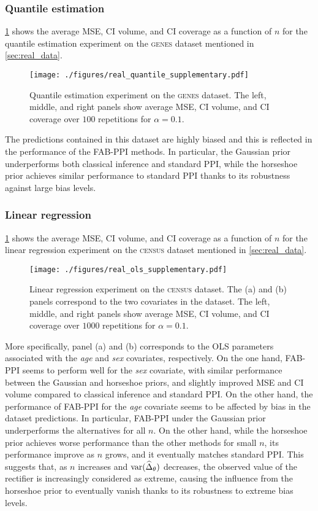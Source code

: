 \subsubsection{Quantile estimation}\label{app:quantile}
\cref{fig:real_quantile_supplementary} shows the average MSE, CI volume, and CI coverage as a function of $n$ for the quantile estimation experiment on the \textsc{genes} dataset mentioned in \cref{sec:real_data}.
\begin{figure}[ht!]
    \centering
    \texttt{[image: ./figures/real\_quantile\_supplementary.pdf]}
    \caption{Quantile estimation experiment on the \textsc{genes} dataset. The left, middle, and right panels show average MSE, CI volume, and CI coverage over $100$ repetitions for $\alpha = 0.1$.}
    \label{fig:real_quantile_supplementary}
\end{figure}
The predictions contained in this dataset are highly biased and this is reflected in the performance of the FAB-PPI methods. In particular, the Gaussian prior underperforms both classical inference and standard PPI, while the horseshoe prior achieves similar performance to standard PPI thanks to its robustness against large bias levels.

\subsubsection{Linear regression}\label{app:ols}
\cref{fig:real_quantile_supplementary} shows the average MSE, CI volume, and CI coverage as a function of $n$ for the linear regression experiment on the \textsc{census} dataset mentioned in \cref{sec:real_data}.
\begin{figure}[ht!]
    \centering
    \texttt{[image: ./figures/real\_ols\_supplementary.pdf]}
    \caption{Linear regression experiment on the \textsc{census} dataset. The (a) and (b) panels correspond to the two covariates in the dataset. The left, middle, and right panels show average MSE, CI volume, and CI coverage over $1000$ repetitions for $\alpha = 0.1$.}
    \label{fig:real_ols_supplementary}
\end{figure}
More specifically, panel (a) and (b) corresponds to the OLS parameters associated with the \textit{age} and \textit{sex} covariates, respectively. On the one hand, FAB-PPI seems to perform well for the \textit{sex} covariate, with similar performance between the Gaussian and horseshoe priors, and slightly improved MSE and CI volume compared to classical inference and standard PPI. On the other hand, the performance of FAB-PPI for the \textit{age} covariate seems to be affected by bias in the dataset predictions. In particular, FAB-PPI under the Gaussian prior underperforms the alternatives for all $n$. On the other hand, while the horseshoe prior achieves worse performance than the other methods for small $n$, its performance improve as $n$ grows, and it eventually matches standard PPI. This suggests that, as $n$ increases and $\mathrm{var}(\widehat{\Delta}_\theta)$ decreases, the observed value of the rectifier is increasingly considered as extreme, causing the influence from the horseshoe prior to eventually vanish thanks to its robustness to extreme bias levels.
